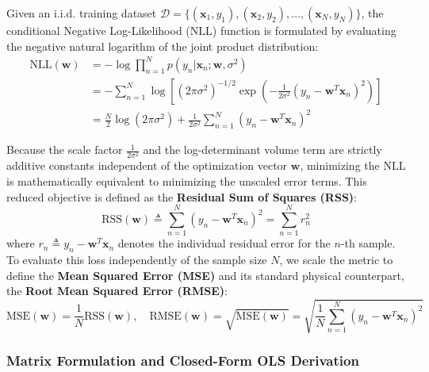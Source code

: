 \documentclass{article}
\begin{document}
Given an i.i.d. training dataset $\mathcal{D} = \{(\mathbf{x}_1, y_1), (\mathbf{x}_2, y_2), \dots, (\mathbf{x}_N, y_N)\}$, the conditional Negative Log-Likelihood ($\text{NLL}$) function is formulated by evaluating the negative natural logarithm of the joint product distribution:
\begin{align*}
\text{NLL}(\mathbf{w}) &= -\log \prod_{n=1}^N p(y_n | \mathbf{x}_n; \mathbf{w}, \sigma^2) \\
&= -\sum_{n=1}^N \log \left[ \left(2\pi\sigma^2\right)^{-1/2} \exp\left( -\frac{1}{2\sigma^2} (y_n - \mathbf{w}^T \mathbf{x}_n)^2 \right) \right] \\
&= \frac{N}{2}\log(2\pi\sigma^2) + \frac{1}{2\sigma^2} \sum_{n=1}^N (y_n - \mathbf{w}^T \mathbf{x}_n)^2
\end{align*}

Because the scale factor $\frac{1}{2\sigma^2}$ and the log-determinant volume term are strictly additive constants independent of the optimization vector $\mathbf{w}$, minimizing the $\text{NLL}$ is mathematically equivalent to minimizing the unscaled error terms. This reduced objective is defined as the \textbf{Residual Sum of Squares (RSS)}:
\begin{equation}
\text{RSS}(\mathbf{w}) \triangleq \sum_{n=1}^N (y_n - \mathbf{w}^T \mathbf{x}_n)^2 = \sum_{n=1}^N r_n^2
\end{equation}
where $r_n \triangleq y_n - \mathbf{w}^T \mathbf{x}_n$ denotes the individual residual error for the $n$-th sample. To evaluate this loss independently of the sample size $N$, we scale the metric to define the \textbf{Mean Squared Error (MSE)} and its standard physical counterpart, the \textbf{Root Mean Squared Error (RMSE)}:
\begin{equation}
\text{MSE}(\mathbf{w}) = \frac{1}{N}\text{RSS}(\mathbf{w}), \quad \text{RMSE}(\mathbf{w}) = \sqrt{\text{MSE}(\mathbf{w})} = \sqrt{\frac{1}{N}\sum_{n=1}^N (y_n - \mathbf{w}^T \mathbf{x}_n)^2}
\end{equation}

\subsubsection{Matrix Formulation and Closed-Form OLS Derivation}
\end{document}
